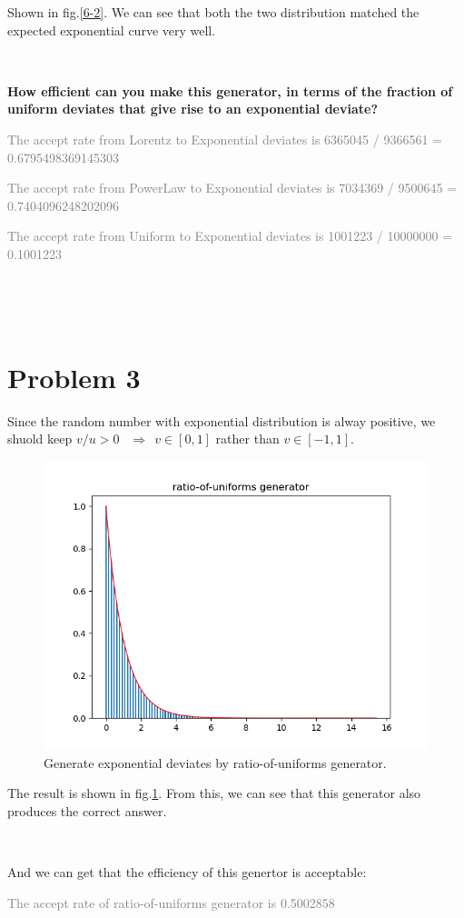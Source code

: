 \documentclass[showpacs, oneside, onecolumn, prl, amsmath, amssymb, nofootinbib, superscriptaddress, notitlepage]{revtex4-1}
\newcommand\bfig{\begin{figure}}
\newcommand\efig{\end{figure}}
\newcommand\RA{$\ \ \Rightarrow\ \ $}
\newcommand\gray{\textcolor{gray}}
\begin{document}
Shown in fig.\ref{6-2}. We can see that both the two distribution matched the expected exponential curve very well.

~~~~

\textbf{How efficient can you make this generator, in terms of the fraction of uniform deviates that give rise to an exponential deviate?}

\gray{The accept rate from Lorentz to Exponential deviates is 6365045 / 9366561 = 0.6795498369145303}

\gray{The accept rate from PowerLaw to Exponential deviates is 7034369 / 9500645 = 0.7404096248202096}

\gray{The accept rate from Uniform to Exponential deviates is 1001223 / 10000000 = 0.1001223}


~~~~

~~~~

\section{Problem 3}

Since the random number with exponential distribution is alway positive, we shuold keep $v/u>0$ \RA $v\in [0,1]$ rather than $v\in[-1,1]$.

\bfig
	\centering
	\includegraphics[scale=0.8]{6-3.png}
	\caption{Generate exponential deviates by ratio-of-uniforms generator.}
	\label{6-3}
\efig

The result is shown in fig.\ref{6-3}. From this, we can see that this generator also produces the correct answer.

~~~~

And we can get that the efficiency of this genertor is acceptable:

\gray{The accept rate of ratio-of-uniforms generator is 0.5002858}
\end{document}
